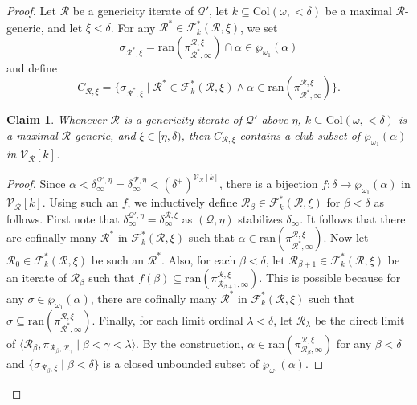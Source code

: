 \documentclass{amsart}
\newtheorem{claim}{Claim}[dfn]
\renewcommand{\subset}{\subseteq}
\newcommand{\power}{\wp}
\begin{document}
\begin{proof}
    Let $\mathcal{R}$ be a genericity iterate of $\mathcal{Q}'$, let $k\subset\mathrm{Col}(\omega, {<}\delta)$ be a maximal $\mathcal{R}$-generic, and let $\xi<\delta$.
    For any $\mathcal{R}^*\in\mathcal{F}^*_k(\mathcal{R}, \xi)$, we set
    \[
    \sigma_{\mathcal{R}^*, \xi} = \mathrm{ran}(\pi^{\mathcal{R}, \xi}_{\mathcal{R}^*, \infty})\cap\alpha\in\power_{\omega_1}(\alpha)
    \]
    and define
    \[
    C_{\mathcal{R}, \xi}  = \{\sigma_{\mathcal{R}^*, \xi}\mid\mathcal{R}^*\in\mathcal{F}^*_k(\mathcal{R}, \xi)\land\alpha\in\mathrm{ran}(\pi^{\mathcal{R}, \xi}_{\mathcal{R}^*, \infty})\}.
    \]
\begin{claim}\label{finding_clubs}
    Whenever $\mathcal{R}$ is a genericity iterate of $\mathcal{Q}'$ above $\eta$, $k\subset\mathrm{Col}(\omega, {<}\delta)$ is a maximal $\mathcal{R}$-generic, and $\xi\in[\eta, \delta)$, then $C_{\mathcal{R}, \xi}$ contains a club subset of $\power_{\omega_1}(\alpha)$ in $\mathcal{V}_{\mathcal{R}}[k]$.
\end{claim}
\begin{proof}
    Since $\alpha<\delta^{\mathcal{Q}', \eta}_{\infty}=\delta^{\mathcal{R}, \eta}_{\infty}<(\delta^+)^{\mathcal{V}_{\mathcal{R}}[k]}$, there is a bijection $f\colon\delta\to\power_{\omega_1}(\alpha)$ in $\mathcal{V}_{\mathcal{R}}[k]$.
    Using such an $f$, we inductively define $\mathcal{R}_{\beta}\in\mathcal{F}^*_k(\mathcal{R}, \xi)$ for $\beta<\delta$ as follows.
    First note that $\delta^{\mathcal{Q}', \eta}_{\infty}=\delta^{\mathcal{R}, \xi}_{\infty}$ as $(\mathcal{Q}, \eta)$ stabilizes $\delta_{\infty}$.
    It follows that there are cofinally many $\mathcal{R}^*$ in $\mathcal{F}^*_k(\mathcal{R}, \xi)$ such that $\alpha\in\mathrm{ran}(\pi^{\mathcal{R}, \xi}_{\mathcal{R}^*, \infty})$.
    Now let $\mathcal{R}_0\in\mathcal{F}^*_k(\mathcal{R}, \xi)$ be such an $\mathcal{R}^*$.
    Also, for each $\beta<\delta$, let $\mathcal{R}_{\beta+1}\in\mathcal{F}^*_k(\mathcal{R}, \xi)$ be an iterate of $\mathcal{R}_{\beta}$ such that $f(\beta)\subset\mathrm{ran}(\pi^{\mathcal{R}, \xi}_{\mathcal{R}_{\beta+1}, \infty})$.
    This is possible because for any $\sigma\in\power_{\omega_1}(\alpha)$, there are cofinally many $\mathcal{R}^*$ in $\mathcal{F}^*_k(\mathcal{R}, \xi)$ such that $\sigma\subset\mathrm{ran}(\pi^{\mathcal{R}, \xi}_{\mathcal{R}^*, \infty})$.
    Finally, for each limit ordinal $\lambda<\delta$, let $\mathcal{R}_{\lambda}$ be the direct limit of $\langle\mathcal{R}_\beta, \pi_{\mathcal{R}_{\beta}, \mathcal{R}_{\gamma}}\mid\beta<\gamma<\lambda\rangle$.
    By the construction, $\alpha\in\mathrm{ran}(\pi^{\mathcal{R}, \xi}_{\mathcal{R}_{\beta}, \infty})$ for any $\beta<\delta$ and $\{\sigma_{\mathcal{R}_{\beta}, \xi}\mid\beta<\delta\}$ is a closed unbounded subset of $\power_{\omega_1}(\alpha)$.
\end{proof}


\end{proof}
\end{document}
